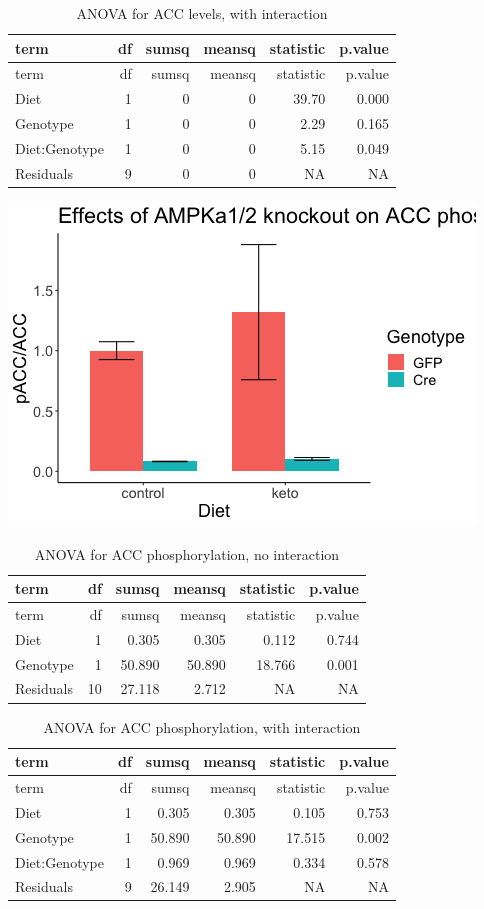 \documentclass[
]{article}
\begin{document}
\begin{longtable}[]{@{}lrrrrr@{}}
\caption{ANOVA for ACC levels, with interaction}\tabularnewline
\toprule
term & df & sumsq & meansq & statistic & p.value\tabularnewline
\midrule
\endfirsthead
\toprule
term & df & sumsq & meansq & statistic & p.value\tabularnewline
\midrule
\endhead
Diet & 1 & 0 & 0 & 39.70 & 0.000\tabularnewline
Genotype & 1 & 0 & 0 & 2.29 & 0.165\tabularnewline
Diet:Genotype & 1 & 0 & 0 & 5.15 & 0.049\tabularnewline
Residuals & 9 & 0 & 0 & NA & NA\tabularnewline
\bottomrule
\end{longtable}

\includegraphics{figures/pACC-barplot-1.png}

\begin{longtable}[]{@{}lrrrrr@{}}
\caption{ANOVA for ACC phosphorylation, no interaction}\tabularnewline
\toprule
term & df & sumsq & meansq & statistic & p.value\tabularnewline
\midrule
\endfirsthead
\toprule
term & df & sumsq & meansq & statistic & p.value\tabularnewline
\midrule
\endhead
Diet & 1 & 0.305 & 0.305 & 0.112 & 0.744\tabularnewline
Genotype & 1 & 50.890 & 50.890 & 18.766 & 0.001\tabularnewline
Residuals & 10 & 27.118 & 2.712 & NA & NA\tabularnewline
\bottomrule
\end{longtable}

\begin{longtable}[]{@{}lrrrrr@{}}
\caption{ANOVA for ACC phosphorylation, with interaction}\tabularnewline
\toprule
term & df & sumsq & meansq & statistic & p.value\tabularnewline
\midrule
\endfirsthead
\toprule
term & df & sumsq & meansq & statistic & p.value\tabularnewline
\midrule
\endhead
Diet & 1 & 0.305 & 0.305 & 0.105 & 0.753\tabularnewline
Genotype & 1 & 50.890 & 50.890 & 17.515 & 0.002\tabularnewline
Diet:Genotype & 1 & 0.969 & 0.969 & 0.334 & 0.578\tabularnewline
Residuals & 9 & 26.149 & 2.905 & NA & NA\tabularnewline
\bottomrule
\end{longtable}
\end{document}
